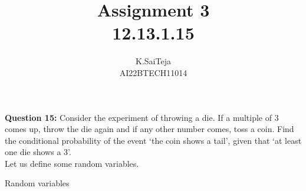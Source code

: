 \documentclass[journal,12pt,twocolumn]{IEEEtran}
\begin{document}
\let\StandardTheFigure\thefigure
\let\vec\mathbf
\def\putbox#1#2#3{\makebox[0in][l]{\makebox[#1][l]{}\raisebox{\baselineskip}[0in][0in]{\raisebox{#2}[0in][0in]{#3}}}}
     \def\rightbox#1{\makebox[0in][r]{#1}}
     \def\centbox#1{\makebox[0in]{#1}}
     \def\topbox#1{\raisebox{-\baselineskip}[0in][0in]{#1}}
     \def\midbox#1{\raisebox{-0.5\baselineskip}[0in][0in]{#1}}
\vspace{3cm}

\title{Assignment 3 \\ 12.13.1.15}
\author{K.SaiTeja \\ AI22BTECH11014}	

\maketitle

\textbf{Question 15:}
Consider the experiment of throwing a die. If a multiple of 3 comes up, throw the die again and if any other number comes, toss a coin. Find the conditional probability of the event \lq the coin shows a tail\rq, given that \lq at least one die shows a 3\rq.\\
\solution
Let us define some random variables.
\begin{table}[ht!]
    \centering
	
    \caption{Random variables}
    \label{table:RandomVariables}	
\end{table}
\end{document}
